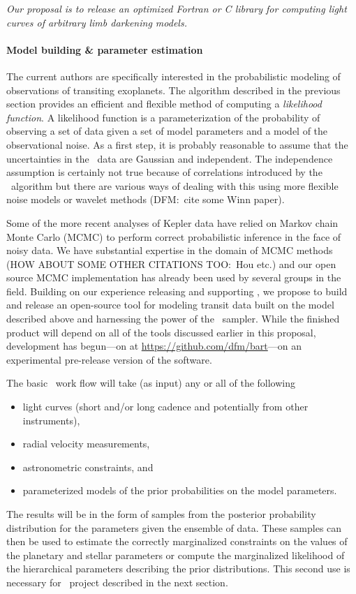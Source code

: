 \documentclass[letterpaper,12pt,preprint]{hack_aastex}
\newcommand{\Untrendy}{\package{Untrendy}}
\newcommand{\Bart}{\package{Bart}}
\newcommand{\emcee}{\package{emcee}}
\newcommand{\TheCreator}{\package{TheCreator}}
\begin{document}
\textit{Our proposal is to release an optimized Fortran or C library for
computing light curves of arbitrary limb darkening models.}


\paragraph{Model building \& parameter estimation}
The current authors are specifically interested in the probabilistic modeling
of observations of transiting exoplanets.
The algorithm described in the previous section provides an efficient and
flexible method of computing a \textit{likelihood function}.
A likelihood function is a parameterization of the probability of observing a
set of data given a set of model parameters and a model of the observational
noise.
As a first step, it is probably reasonable to assume that the uncertainties in
the \Kepler\ data are Gaussian and independent.
The independence assumption is certainly not true because of correlations
introduced by the \Untrendy\ algorithm but there are various ways of dealing
with this using more flexible noise models or wavelet methods (DFM:\ cite some
Winn paper).

Some of the more recent analyses of Kepler data have relied on Markov chain
Monte Carlo (MCMC) to perform correct probabilistic inference in the face of
noisy data.
We have substantial expertise in the domain of MCMC methods \citep{emcee} (HOW
ABOUT SOME OTHER CITATIONS TOO:\ Hou etc.) and our open source MCMC
implementation has already been used by several groups in the field.
Building on our experience releasing and supporting \emcee, we propose to
build and release an open-source tool for modeling transit data built on the
model described above and harnessing the power of the \emcee\ sampler.
While the finished product will depend on all of the tools discussed earlier
in this proposal, development has begun---on  at
\url{https://github.com/dfm/bart}---on an experimental pre-release version of
the software.

The basic \Bart\ work flow will take (as input) any or all of the following
\begin{itemize}
\item light curves (short and/or long cadence and potentially from other
instruments),
\item radial velocity measurements,
\item astronometric constraints, and
\item parameterized models of the prior probabilities on the model parameters.
\end{itemize}
The results will be in the form of samples from the posterior probability
distribution for the parameters given the ensemble of data.
These samples can then be used to estimate the correctly marginalized
constraints on the values of the planetary and stellar parameters or compute
the marginalized likelihood of the hierarchical parameters describing the
prior distributions.
This second use is necessary for \TheCreator\ project described in the next
section.
\end{document}
